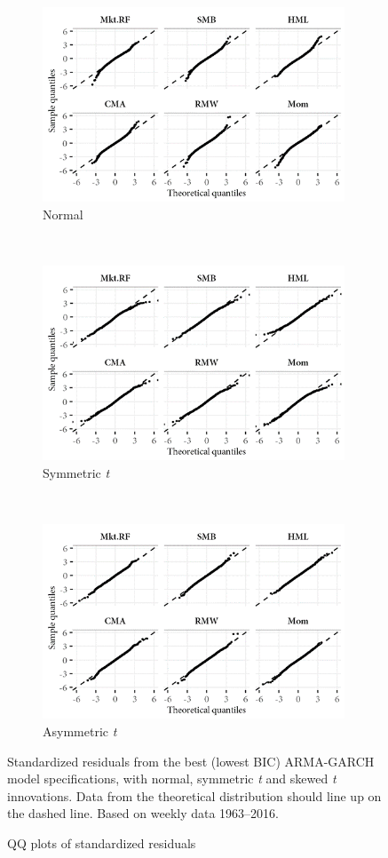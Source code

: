 \begin{figure}[!pt]
  \centering
  \footnotesize

  \begin{subfigure}{9cm}
    \includegraphics[width = 9cm]{graphics/qq_norm.png}
    \caption{Normal}
  \end{subfigure}
  \\
  \begin{subfigure}{9cm}
    \includegraphics[width = 9cm]{graphics/qq_std.png}
    \caption{Symmetric \emph{t}}
  \end{subfigure}
  \\
  \begin{subfigure}{9cm}
    \includegraphics[width = 9cm]{graphics/qq_ghst.png}
    \caption{Asymmetric \emph{t}}
  \end{subfigure}
  \caption{QQ plots of standardized residuals}
  \begin{longcaption}
    Standardized residuals from the best (lowest BIC) ARMA-GARCH model specifications, with normal, symmetric \emph{t} and skewed \emph{t} innovations. Data from the theoretical distribution should line up on the dashed line. Based on weekly data 1963--2016.
  \end{longcaption}
  \label{fig:garch_qq}
\end{figure}

